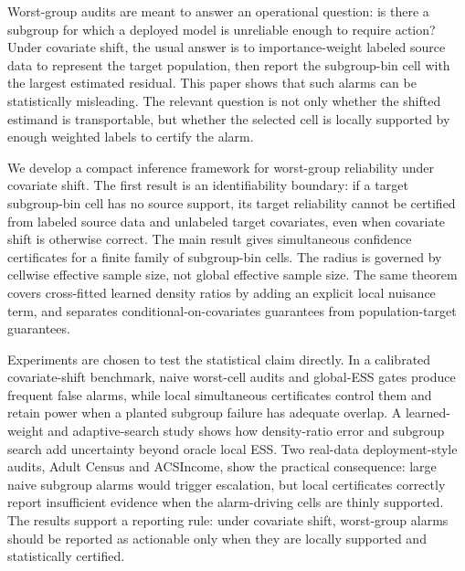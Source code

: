 Worst-group audits are meant to answer an operational question: is there a subgroup for which a deployed model is unreliable enough to require action? Under covariate shift, the usual answer is to importance-weight labeled source data to represent the target population, then report the subgroup-bin cell with the largest estimated residual. This paper shows that such alarms can be statistically misleading. The relevant question is not only whether the shifted estimand is transportable, but whether the selected cell is locally supported by enough weighted labels to certify the alarm.

We develop a compact inference framework for worst-group reliability under covariate shift. The first result is an identifiability boundary: if a target subgroup-bin cell has no source support, its target reliability cannot be certified from labeled source data and unlabeled target covariates, even when covariate shift is otherwise correct. The main result gives simultaneous confidence certificates for a finite family of subgroup-bin cells. The radius is governed by cellwise effective sample size, not global effective sample size. The same theorem covers cross-fitted learned density ratios by adding an explicit local nuisance term, and separates conditional-on-covariates guarantees from population-target guarantees.

Experiments are chosen to test the statistical claim directly. In a calibrated covariate-shift benchmark, naive worst-cell audits and global-ESS gates produce frequent false alarms, while local simultaneous certificates control them and retain power when a planted subgroup failure has adequate overlap. A learned-weight and adaptive-search study shows how density-ratio error and subgroup search add uncertainty beyond oracle local ESS. Two real-data deployment-style audits, Adult Census and ACSIncome, show the practical consequence: large naive subgroup alarms would trigger escalation, but local certificates correctly report insufficient evidence when the alarm-driving cells are thinly supported. The results support a reporting rule: under covariate shift, worst-group alarms should be reported as actionable only when they are locally supported and statistically certified.
